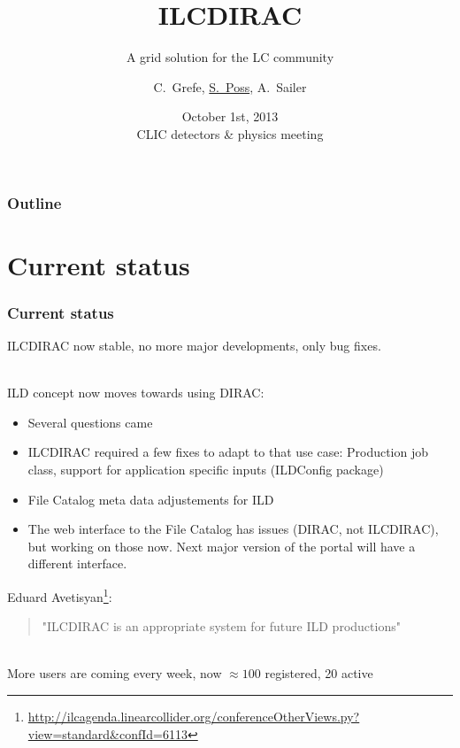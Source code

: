 \documentclass[10pt,table,dvipsnames]{beamer}
\author{C.~Grefe, \underline{S.~Poss}, A.~Sailer}
\title{ILCDIRAC}
\subtitle{A grid solution for the LC community}
\date[Oct. 1st 2013, CLIC dp meeting]{October 1st, 2013\\CLIC detectors \& physics meeting}
\institute{CERN}
\begin{document}
\renewcommand{\inserttotalframenumber}{\ref{lastframe}}
\begin{frame}
\titlepage
\end{frame}

\begin{frame}
\frametitle{Outline}
\tableofcontents
\end{frame}

\section{Current status}
\begin{frame}
\frametitle{Current status}
ILCDIRAC now stable, no more major developments, only bug fixes.

~\\

ILD concept now moves towards using DIRAC:
\begin{itemize}
\item Several questions came
\item ILCDIRAC required a few fixes to adapt to that use case: Production job class, support for application specific inputs (ILDConfig package)
\item File Catalog meta data adjustements for ILD
\item The web interface to the File Catalog has issues (DIRAC, not ILCDIRAC), but working on those now. Next major version of the portal will have a different interface.
\end{itemize}
Eduard Avetisyan\footnote{\url{http://ilcagenda.linearcollider.org/conferenceOtherViews.py?view=standard&confId=6113}}:
\begin{quote}
"ILCDIRAC is an appropriate system for future ILD productions"
\end{quote}
~\\
More users are coming every week, now $\approx 100$ registered, 20 active
\end{frame}
\end{document}
